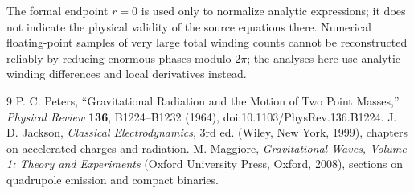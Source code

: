 \documentclass[aps,prd,reprint,onecolumn,superscriptaddress,nofootinbib]{revtex4-2}
\begin{document}
The formal endpoint $r=0$ is used only to normalize analytic expressions; it does not indicate the physical validity of the source equations there. Numerical floating-point samples of very large total winding counts cannot be reconstructed reliably by reducing enormous phases modulo $2\pi$; the analyses here use analytic winding differences and local derivatives instead.

\begin{thebibliography}{9}
 P. C. Peters, ``Gravitational Radiation and the Motion of Two Point Masses,'' \textit{Physical Review} \textbf{136}, B1224--B1232 (1964), doi:10.1103/PhysRev.136.B1224.
 J. D. Jackson, \textit{Classical Electrodynamics}, 3rd ed. (Wiley, New York, 1999), chapters on accelerated charges and radiation.
 M. Maggiore, \textit{Gravitational Waves, Volume 1: Theory and Experiments} (Oxford University Press, Oxford, 2008), sections on quadrupole emission and compact binaries.
\end{thebibliography}
\end{document}
